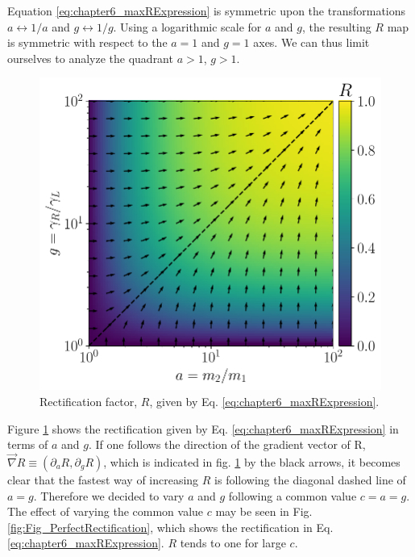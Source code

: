 Equation \eqref{eq:chapter6_maxRExpression} is symmetric upon the transformations $a \leftrightarrow 1/a$ and $g \leftrightarrow 1/g$. Using a logarithmic scale for $a$ and $g$, the resulting $R$ map is symmetric with respect to the $a=1$ and $g=1$ axes. We can thus limit ourselves to analyze the quadrant $a > 1$, $g > 1$.


\begin{figure}
  \center
  \includegraphics[width=0.75\linewidth]{Figures/Rade.pdf}
  \caption{Rectification factor, $R$, given by Eq. \eqref{eq:chapter6_maxRExpression}.}
  \label{fig:R_g_a_plane}
\end{figure}

Figure \ref{fig:R_g_a_plane} shows the rectification given by Eq. \eqref{eq:chapter6_maxRExpression} in terms of $a$ and $g$. If one follows the direction of the gradient vector of R, $\overrightarrow{\nabla}R\equiv\left( \partial_a R, \partial_g R \right)$, which is indicated in fig. \ref{fig:R_g_a_plane} by the black arrows, it becomes clear that the fastest way of increasing $R$ is following the diagonal dashed line of $a=g$. Therefore we decided to vary $a$ and $g$ following a common value $c=a = g$. The effect of varying  the common value $c$ may be seen in Fig. \ref{fig:Fig_PerfectRectification}, which  shows the rectification in Eq. \eqref{eq:chapter6_maxRExpression}. $R$ tends to one for large $c$.
%
%
